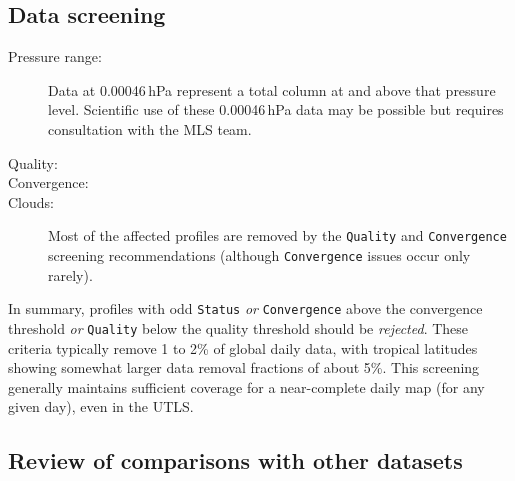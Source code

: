 \begin{nofloatpages}
\subsection{Data screening}
\label{sec:O3Screening}
\begin{description}
\item[Pressure range:]  \standardrangestatement{} Data at 0.00046\,hPa represent a total column at and above that pressure level. Scientific use of these 0.00046\,hPa data may be possible but requires consultation with the MLS team. \standardprecisionrule \evenstatusrule

\item[Quality:] 

\item[Convergence:] 

\item[Clouds:]  Most of the affected profiles are removed by the \texttt{Quality} and \texttt{Convergence} screening recommendations (although \texttt{Convergence} issues occur only rarely).
\end{description}
\end{nofloatpages}

\noindent In summary, profiles with odd \texttt{Status} \emph{or} \texttt{Convergence} above the convergence threshold \emph{or} \texttt{Quality} below the quality threshold should be \emph{rejected}. These criteria typically remove 1 to 2\% of global daily data, with tropical latitudes showing somewhat larger data removal fractions of about 5\%. This screening generally maintains sufficient coverage for a near-complete daily map (for any given day), even in the UTLS\@.

\subsection{Review of comparisons with other datasets}

